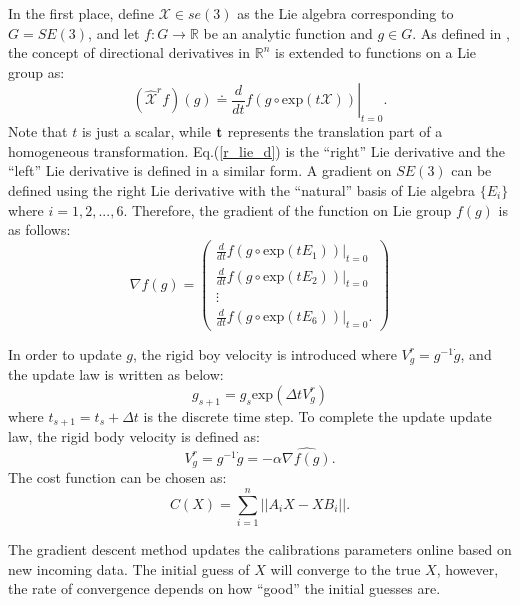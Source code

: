 \documentclass[twocolumn,10pt]{asme2ej}
\newcommand{\ttt}{{\bf t}}
\begin{document}
In the first place, define $\mathcal{X} \in se(3)$ as the Lie algebra corresponding to $G = SE(3)$, and let $f:G \rightarrow \mathbb{R}$ be an analytic function and $g \in G$. As defined in \cite{myoldbook}, the concept of directional derivatives in $\mathbb{R}^{n}$ is extended to functions on a Lie group as:
\begin{equation}
\left.(\hat{\mathcal{X}}^{r}f)(g)\doteq \dfrac{d}{dt}f(g\circ \text{exp}(t\mathcal{X}))\right\vert_{t=0}.
\label{r_lie_d}
\end{equation}
Note that $t$ is just a scalar, while $\ttt$ represents the translation part of a homogeneous transformation.
Eq.(\ref{r_lie_d}) is the ``right'' Lie derivative and the ``left'' Lie derivative is defined in a similar form. A gradient on $SE(3)$ can be defined using the right Lie derivative with the ``natural'' basis of Lie algebra $\{E_{i}\}$ where $i = 1,2,...,6$. Therefore, the gradient of the function on Lie group $f(g)$ is as follows:
\begin{equation}
\nabla f(g)= \left( 
\begin{matrix}
\frac{d}{dt}\left.f(g\circ \text{exp}(tE_{1}))\right\vert _{t=0} \\
\frac{d}{dt}\left.f(g\circ \text{exp}(tE_{2}))\right\vert _{t=0} \\
\vdots \\
\frac{d}{dt}\left.f(g\circ \text{exp}(tE_{6}))\right\vert _{t=0}.
\end{matrix}
\right)
\end{equation}

In order to update $g$, the rigid boy velocity is introduced where $V^{r}_{g} = g^{-1}\dot{g}$, and the update law is written as below:
\begin{equation}
g_{s+1} = g_{s}\text{exp}(\Delta t V^{r}_{g})
\end{equation}
where $t_{s+1} = t_{s} + \Delta t$ is the discrete time step. To complete the update update law, the rigid body velocity is defined as: 
\begin{equation}
V^{r}_{g} = g^{-1}\dot{g} = -\alpha \widehat{\nabla f(g)}.
\end{equation} 
The cost function can be chosen as:
\begin{equation}
C(X) = \sum_{i=1}^{n}||A_{i}X - XB_{i}||.
\end{equation}

The gradient descent method updates the calibrations parameters online based on new incoming data. The initial guess of $X$ will converge to the true $X$, however, the rate of convergence depends on how ``good'' the initial guesses are.
\end{document}
